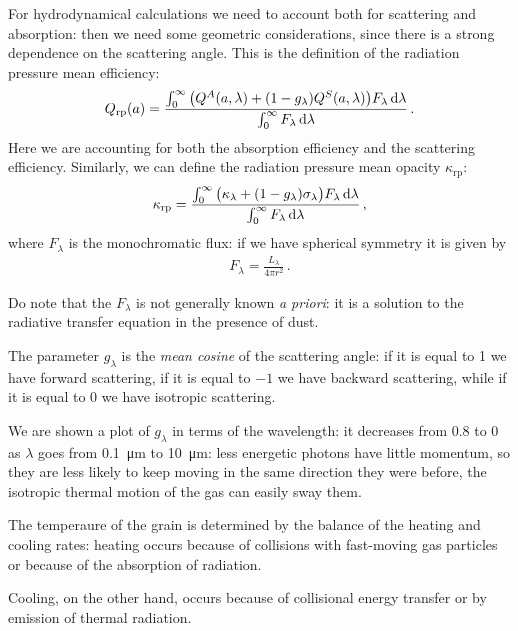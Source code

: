 \documentclass[main.tex]{subfiles}
\begin{document}
For hydrodynamical calculations we need to account both for scattering and absorption: then we need some geometric considerations, since there is a strong dependence on the scattering angle.
This is the definition of the radiation pressure mean efficiency: 
%
\begin{align}
Q _{\text{rp}} (a ) = \frac{\int_{0}^{ \infty  } \qty(Q^{A} (a, \lambda) + (1- g_{\lambda }) Q^{S} (a, \lambda ) ) F_{\lambda } \dd{\lambda }}{\int_{0}^{ \infty } F_{\lambda } \dd{\lambda }}
\,.
\end{align}
%
Here we are accounting for both the absorption efficiency and the scattering efficiency. Similarly, we can define the radiation pressure mean opacity \(\kappa _{\text{rp}}\): 
%
\begin{align}
  \kappa _{\text{rp}} = \frac{\int_{0}^{ \infty  } \qty(\kappa_{\lambda } + (1-g_{\lambda }) \sigma_{\lambda }) F_{\lambda } \dd{\lambda }}{\int_{0}^{ \infty } F_{\lambda } \dd{\lambda }}
\,,
\end{align}
%
where \(F_{\lambda }\) is the monochromatic flux: if we have spherical symmetry it is given by
%
\begin{align}
  F_{\lambda } = \frac{L_{\lambda }}{4 \pi r^2}
  \,.
\end{align}
%

Do note that the \(F_{\lambda }\) is not generally known \emph{a priori}: it is a solution to the radiative transfer equation in the presence of dust.

The parameter \(g_{\lambda }\) is the \emph{mean cosine} of the scattering angle: if it is equal to 1 we have forward scattering, if it is equal to $-1$ we have backward scattering, while if it is equal to 0 we have isotropic scattering. 

We are shown a plot of \(g_{\lambda } \) in terms of the wavelength: it decreases from \num{.8} to 0 as \(\lambda \) goes from \SI{0.1}{\micro\metre} to \SI{10}{\micro\metre}: less energetic photons have little momentum, so they are less likely to keep moving in the same direction they were before, the isotropic thermal motion of the gas can easily sway them.

The temperaure of the grain is determined by the balance of the heating and cooling rates: heating occurs because of collisions with fast-moving gas particles or because of the absorption of radiation. 

Cooling, on the other hand, occurs because of collisional energy transfer or by emission of thermal radiation. 
\end{document}
